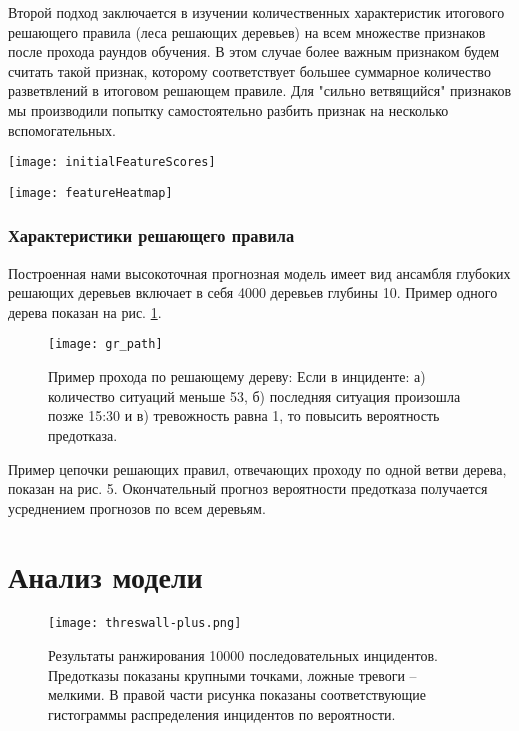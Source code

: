 Второй подход заключается в изучении количественных характеристик итогового решающего правила (леса решающих деревьев) на всем множестве признаков после прохода раундов обучения. В этом случае более важным признаком будем считать такой признак, которому соответствует большее суммарное количество разветвлений в итоговом решающем правиле. Для "сильно ветвящийся" признаков мы производили попытку самостоятельно разбить признак на несколько вспомогательных.

\begin{figure*}
\centering
\texttt{[image: initialFeatureScores]}
\caption{Анализ важности признаков: эффективность отдельных признаков}
\centering
\label{fig:initialFeatureScores}
\end{figure*}



\begin{figure*}
\centering
\texttt{[image: featureHeatmap]}
\caption{Анализ важности признаков: последовательное добавление}
\centering
\label{fig:featureHeatmap}
\end{figure*}


\subsubsection{Характеристики решающего правила}
Построенная нами высокоточная прогнозная модель имеет вид ансамбля глубоких решающих деревьев \cite{friedman2001greedy}
включает в себя 4000 деревьев глубины 10. Пример одного дерева показан на рис. \ref{fig:tree}.

\begin{figure}
\centering
\texttt{[image: gr\_path]}
\caption{Пример прохода по решающему дереву: Если в инциденте: а) количество ситуаций меньше 53, б) последняя ситуация произошла позже 15:30
и в) тревожность равна 1, то повысить вероятность предотказа.
}
\centering
\label{fig:tree}
\end{figure}

Пример цепочки решающих правил, отвечающих проходу по одной ветви дерева, показан на рис. 5. Окончательный прогноз вероятности предотказа получается усреднением прогнозов по всем деревьям.

\section{Анализ модели}

\begin{figure}[thpb]
\centering
\texttt{[image: threswall-plus.png]}
\caption{Результаты ранжирования 10000 последовательных инцидентов.  Предотказы показаны крупными точками, ложные тревоги -- мелкими. В правой части рисунка показаны соответствующие гистограммы распределения инцидентов по вероятности.}
\centering
\label{fig:histo}
\end{figure}


